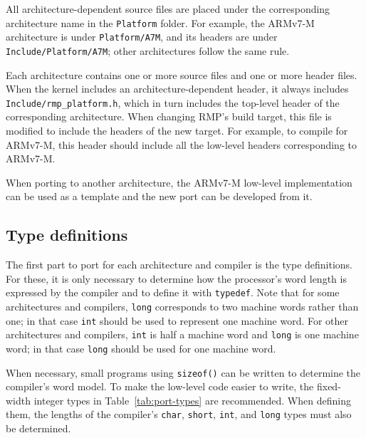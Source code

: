 All architecture-dependent source files are placed under the corresponding architecture name in the \texttt{Platform} folder.
For example, the ARMv7-M architecture is under \texttt{Platform/A7M}, and its headers are under \texttt{Include/Platform/A7M}; other architectures follow the same rule.

Each architecture contains one or more source files and one or more header files.
When the kernel includes an architecture-dependent header, it always includes \texttt{Include/rmp\_platform.h}, which in turn includes the top-level header of the corresponding architecture.
When changing RMP's build target, this file is modified to include the headers of the new target.
For example, to compile for ARMv7-M, this header should include all the low-level headers corresponding to ARMv7-M.

When porting to another architecture, the ARMv7-M low-level implementation can be used as a template and the new port can be developed from it.

\subsection{Type definitions}

The first part to port for each architecture and compiler is the type definitions.
For these, it is only necessary to determine how the processor's word length is expressed by the compiler and to define it with \texttt{typedef}.
Note that for some architectures and compilers, \texttt{long} corresponds to two machine words rather than one; in that case \texttt{int} should be used to represent one machine word.
For other architectures and compilers, \texttt{int} is half a machine word and \texttt{long} is one machine word; in that case \texttt{long} should be used for one machine word.

When necessary, small programs using \texttt{sizeof()} can be written to determine the compiler's word model.
To make the low-level code easier to write, the fixed-width integer types in Table~\ref{tab:port-types} are recommended.
When defining them, the lengths of the compiler's \texttt{char}, \texttt{short}, \texttt{int}, and \texttt{long} types must also be determined.


